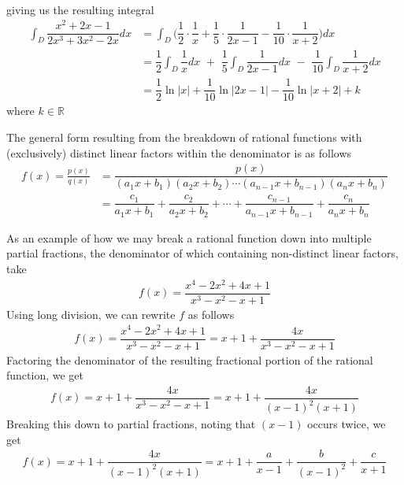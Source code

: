\begin{example}
\begin{align*}
\end{align*}
giving us the resulting integral
\begin{align*}
    \int_{D} \dfrac{x^{2} + 2x - 1}{2x^{3} + 3x^{2} - 2x} dx &= \int_{D} \Big(\dfrac{1}{2} \cdot \dfrac{1}{x} + \dfrac{1}{5} \cdot \dfrac{1}{2x - 1} - \dfrac{1}{10} \cdot \dfrac{1}{x + 2}\Big) dx\\[2ex]
    &= \dfrac{1}{2}\int_{D} \dfrac{1}{x} dx \hspace{4pt} + \hspace{4pt} \dfrac{1}{5}\int_{D} \dfrac{1}{2x - 1} dx \hspace{4pt} - \hspace{4pt} \dfrac{1}{10}\int_{D} \dfrac{1}{x+2} dx\\[2ex]
    &= \dfrac{1}{2}\ln \lvert x \rvert + \dfrac{1}{10}\ln \lvert 2x - 1 \rvert - \dfrac{1}{10}\ln \lvert x + 2 \rvert + k
\end{align*}
where $k \in \mathbb{R}$
\end{example}

\begin{example}
The general form resulting from the breakdown of rational functions with (exclusively) distinct linear factors within the denominator is as follows
\begin{align*}
    f(x) = \frac{p(x)}{q(x)} &= \dfrac{p(x)}{(a_{1}x + b_{1})(a_{2}x + b_{2}) \cdots (a_{n-1}x + b_{n-1})(a_{n}x + b_{n})}\\[2ex]
    &= \dfrac{c_{1}}{a_{1}x + b_{1}} + \dfrac{c_{2}}{a_{2}x + b_{2}} + \cdots + \dfrac{c_{n-1}}{a_{n-1}x + b_{n-1}} + \dfrac{c_{n}}{a_{n}x + b_{n}}
\end{align*}
\end{example}

\begin{example}
As an example of how we may break a rational function down into multiple partial fractions, the denominator of which containing non-distinct linear factors, take
\begin{align*}
    f(x) = \dfrac{x^{4} - 2x^{2} + 4x + 1}{x^{3} - x^{2} - x + 1}
\end{align*}
Using long division, we can rewrite $f$ as follows
\begin{align*}
    f(x) = \dfrac{x^{4} - 2x^{2} + 4x + 1}{x^{3} - x^{2} - x + 1} = x + 1 + \dfrac{4x}{x^{3} - x^{2} - x + 1}
\end{align*}
Factoring the denominator of the resulting fractional portion of the rational function, we get
\begin{align*}
    f(x) = x + 1 + \dfrac{4x}{x^{3} - x^{2} - x + 1} = x + 1 + \dfrac{4x}{(x-1)^{2} (x+1)}
\end{align*}
Breaking this down to partial fractions, noting that $(x-1)$ occurs twice, we get
\begin{align*}
    f(x) = x + 1 + \dfrac{4x}{(x-1)^{2} (x+1)} = x + 1 + \dfrac{a}{x - 1} + \dfrac{b}{(x - 1)^{2}} + \dfrac{c}{x + 1}
\end{align*}
\end{example}

